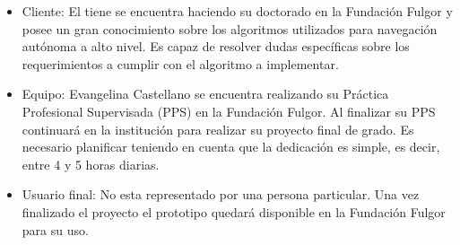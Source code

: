 \documentclass[
11pt, %
codirector, %
]{charter}
\begin{document}



 


\begin{itemize}
	\item Cliente: El \clientename{} tiene se encuentra haciendo su doctorado en la Fundación Fulgor y posee un gran conocimiento sobre los algoritmos utilizados para navegación autónoma a alto nivel. Es capaz de resolver dudas específicas sobre los requerimientos a cumplir con el algoritmo a implementar.
	\item Equipo: Evangelina Castellano se encuentra realizando su Práctica Profesional Supervisada (PPS) en la Fundación Fulgor. Al finalizar su PPS continuará en la institución para realizar su proyecto final de grado. Es necesario planificar teniendo en cuenta que la dedicación es simple, es decir, entre 4 y 5 horas diarias.
	\item Usuario final: No esta representado por una persona particular. Una vez finalizado el proyecto el prototipo quedará disponible en la Fundación Fulgor para su uso.
\end{itemize}
\end{document}

